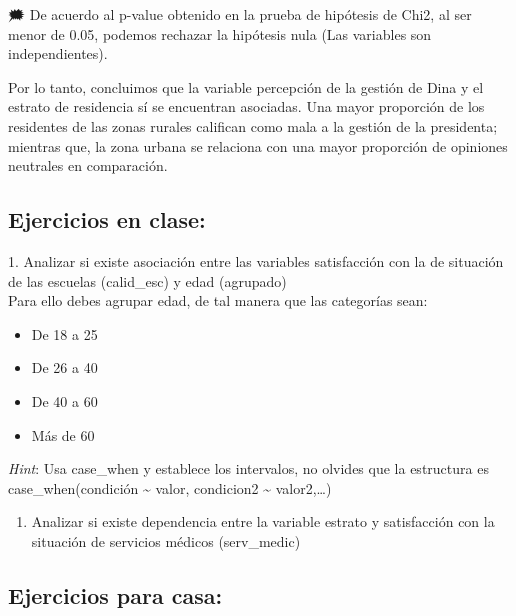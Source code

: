 \documentclass[
]{article}
\providecommand{\tightlist}{%
  \setlength{\itemsep}{0pt}\setlength{\parskip}{0pt}}
\begin{document}
🗯️ De acuerdo al p-value obtenido en la prueba de hipótesis de Chi2, al
ser menor de 0.05, podemos rechazar la hipótesis nula (Las variables son
independientes).

Por lo tanto, concluimos que la variable percepción de la gestión de
Dina y el estrato de residencia sí se encuentran asociadas. Una mayor
proporción de los residentes de las zonas rurales califican como mala a
la gestión de la presidenta; mientras que, la zona urbana se relaciona
con una mayor proporción de opiniones neutrales en comparación.

\hypertarget{ejercicios-en-clase}{%
\subsection{Ejercicios en clase:}\label{ejercicios-en-clase}}

1. Analizar si existe asociación entre las variables satisfacción con la
de situación de las escuelas (calid\_esc) y edad (agrupado)\\
Para ello debes agrupar edad, de tal manera que las categorías sean:

\begin{itemize}
\item
  De 18 a 25
\item
  De 26 a 40
\item
  De 40 a 60
\item
  Más de 60
\end{itemize}

\emph{Hint}: Usa case\_when y establece los intervalos, no olvides que
la estructura es case\_when(condición \textasciitilde{} valor,
condicion2 \textasciitilde{} valor2,\ldots)

\begin{enumerate}
\def\labelenumi{\arabic{enumi}.}
\setcounter{enumi}{1}
\tightlist
\item
  Analizar si existe dependencia entre la variable estrato y
  satisfacción con la situación de servicios médicos (serv\_medic)
\end{enumerate}

\hypertarget{ejercicios-para-casa}{%
\subsection{Ejercicios para casa:}\label{ejercicios-para-casa}}
\end{document}
